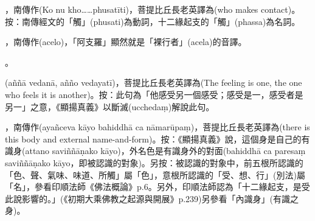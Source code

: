 \startitemgroup[noteitems]
\item{}，南傳作(Ko nu kho……phusatīti)，菩提比丘長老英譯為(who makes contact)。按：南傳經文的「觸」(phusati)為動詞，十二緣起支的「觸」(phassa)為名詞。
\stopitemgroup

\startitemgroup[noteitems]
\item{}，南傳作(acelo)，「阿支羅」顯然就是「裸行者」(acela)的音譯。
\stopitemgroup

\startitemgroup[noteitems]
\item{}。
\stopitemgroup

\startitemgroup[noteitems]
\item{}(aññā vedanā, añño vedayatī)，菩提比丘長老英譯為(The feeling is one, the one who feels it is another)。按：此句為「他感受另一個感受；感受是一，感受者是另一」之意，《顯揚真義》以斷滅(ucchedaṃ)解說此句。
\stopitemgroup

\startitemgroup[noteitems]
\item{}，南傳作(ayañceva kāyo bahiddhā ca nāmarūpaṃ)，菩提比丘長老英譯為(there is this body and external name-and-form)。按：《顯揚真義》說，這個身是自己的有識身(attano saviññāṇako kāyo)，外名色是有識身外的對面(bahiddhā ca paresaṃ saviññāṇako kāyo，即被認識的對象)。另按：被認識的對象中，前五根所認識的「色、聲、氣味、味道、所觸」屬「色」，意根所認識的「受、想、行」(別法)屬「名」，參看印順法師《佛法概論》p.6。另外，印順法師認為「十二緣起支，是受此說影響的。」(《初期大乘佛教之起源與開展》p.239)另參看「內識身」(有識之身)。
\stopitemgroup

